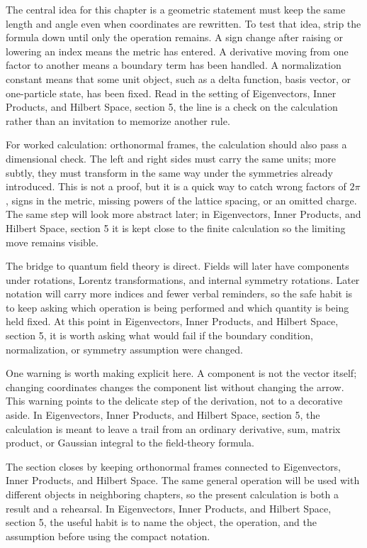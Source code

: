 The central idea for this chapter is a geometric statement must keep the same length and angle even when coordinates are rewritten.  To test that idea, strip the formula down until only the operation remains.  A sign change after raising or lowering an index means the metric has entered.  A derivative moving from one factor to another means a boundary term has been handled.  A normalization constant means that some unit object, such as a delta function, basis vector, or one-particle state, has been fixed.  Read in the setting of Eigenvectors, Inner Products, and Hilbert Space, section 5, the line is a check on the calculation rather than an invitation to memorize another rule.

For worked calculation: orthonormal frames, the calculation should also pass a dimensional check.  The left and right sides must carry the same units; more subtly, they must transform in the same way under the symmetries already introduced.  This is not a proof, but it is a quick way to catch wrong factors of \(2\pi\), signs in the metric, missing powers of the lattice spacing, or an omitted charge.  The same step will look more abstract later; in Eigenvectors, Inner Products, and Hilbert Space, section 5 it is kept close to the finite calculation so the limiting move remains visible.

The bridge to quantum field theory is direct.  Fields will later have components under rotations, Lorentz transformations, and internal symmetry rotations.  Later notation will carry more indices and fewer verbal reminders, so the safe habit is to keep asking which operation is being performed and which quantity is being held fixed.  At this point in Eigenvectors, Inner Products, and Hilbert Space, section 5, it is worth asking what would fail if the boundary condition, normalization, or symmetry assumption were changed.

One warning is worth making explicit here.  A component is not the vector itself; changing coordinates changes the component list without changing the arrow.  This warning points to the delicate step of the derivation, not to a decorative aside.  In Eigenvectors, Inner Products, and Hilbert Space, section 5, the calculation is meant to leave a trail from an ordinary derivative, sum, matrix product, or Gaussian integral to the field-theory formula.

The section closes by keeping orthonormal frames connected to Eigenvectors, Inner Products, and Hilbert Space.  The same general operation will be used with different objects in neighboring chapters, so the present calculation is both a result and a rehearsal.  In Eigenvectors, Inner Products, and Hilbert Space, section 5, the useful habit is to name the object, the operation, and the assumption before using the compact notation.



